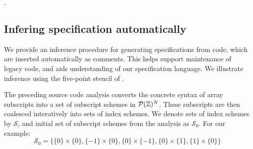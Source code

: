 .


\subsection{Infering specification automatically}
\label{subsec:inference}
%
We provide an inference procedure for generating specifications from
code, which are inserted automatically as comments. This helps support
maintenance of legacy code, and aids understanding of our
specification language. We illustrate inference using the
five-point stencil of .

The preceding source code analysis converts the concrete syntax of
array subscripts into a set of subscript schemes in
$\mathcal{P}(\textnormal{$\mathbb{Z}$})^N$. These subscripts are then coalesced interatively
into sets of index schemes. We denote sets of index schemes by
$\mathcal{S}$, and initial set of subscript schemes from the analysis
as $\mathcal{S}_0$. For our example:
%
\begin{equation*}
\mathcal{S}_0 = \{\{0\} \times \{0\}, \{-1\} \times \{0\},
\{0\} \times \{-1\}, \{0\} \times \{1\}, \{1\} \times \{0\}\}
\end{equation*}


